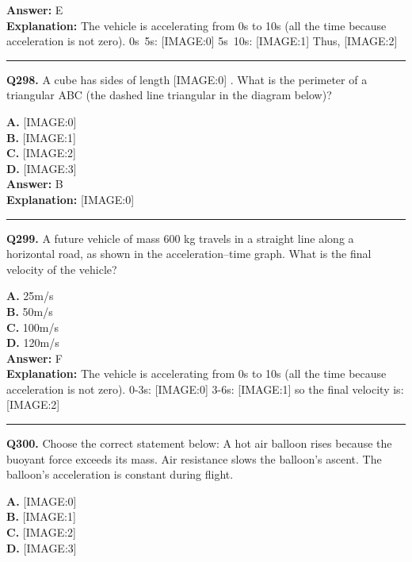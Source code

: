 \documentclass[12pt]{article}
\begin{document}
\textbf{Answer:} E \\
\textbf{Explanation:} The vehicle is accelerating from 0s to 10s (all the time because acceleration is not zero).
0s~5s:
[IMAGE:0]
5s~10s:
[IMAGE:1]
Thus,
[IMAGE:2]

\hrule
\vspace{1em}


\noindent
\textbf{Q298.} A cube has sides of length
[IMAGE:0]
. What is the perimeter of a triangular ABC (the dashed line triangular in the diagram below)?



\textbf{A.} [IMAGE:0] \\
\textbf{B.} [IMAGE:1] \\
\textbf{C.} [IMAGE:2] \\
\textbf{D.} [IMAGE:3] \\

\textbf{Answer:} B \\
\textbf{Explanation:} [IMAGE:0]

\hrule
\vspace{1em}


\noindent
\textbf{Q299.} A future vehicle of mass 600 kg travels in a straight line along a horizontal road, as shown in the acceleration–time graph.
What is the final velocity of the vehicle?



\textbf{A.} 25m/s \\
\textbf{B.} 50m/s \\
\textbf{C.} 100m/s \\
\textbf{D.} 120m/s \\

\textbf{Answer:} F \\
\textbf{Explanation:} The vehicle is accelerating from 0s to 10s (all the time because acceleration is not zero).
0-3s:
[IMAGE:0]
3-6s:
[IMAGE:1]
so the final velocity is:
[IMAGE:2]

\hrule
\vspace{1em}


\noindent
\textbf{Q300.} Choose the correct statement below:
A hot air balloon rises because the buoyant force exceeds its mass.
Air resistance slows the balloon’s ascent.
The balloon’s acceleration is constant during flight.



\textbf{A.} [IMAGE:0] \\
\textbf{B.} [IMAGE:1] \\
\textbf{C.} [IMAGE:2] \\
\textbf{D.} [IMAGE:3] \\
\end{document}
